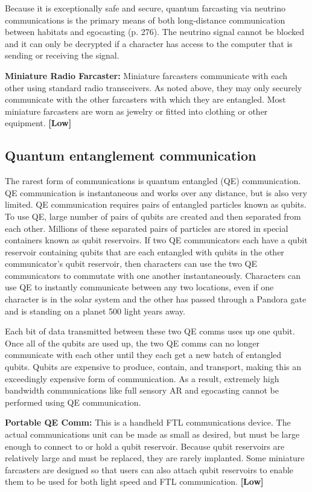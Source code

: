 Because it is exceptionally safe and secure, quantum farcasting via neutrino communications is the primary means of both long-distance communication between habitats and egocasting (p. 276). The neutrino signal cannot be blocked and it can only be decrypted if a character has access to the computer that is sending or receiving the signal. 

\textbf{Miniature Radio Farcaster:} Miniature farcasters communicate with each other using standard radio transceivers. As noted above, they may only securely communicate with the other farcasters with which they are entangled. Most miniature farcasters are worn as jewelry or fitted into clothing or other equipment. \textbf{[Low]} 



\subsection{Quantum entanglement communication} \label{sec:quantum-entanglement-communication} 

The rarest form of communications is quantum entangled (QE) communication. QE communication is instantaneous and works over any distance, but is also very limited. QE communication requires pairs of entangled particles known as qubits. To use QE, large number of pairs of qubits are created and then separated from each other. Millions of these separated pairs of particles are stored in special containers known as qubit reservoirs. If two QE communicators each have a qubit reservoir containing qubits that are each entangled with qubits in the other communicator’s qubit reservoir, then characters can use the two QE communicators to commutate with one another instantaneously. Characters can use QE to instantly communicate between any two locations, even if one character is in the solar system and the other has passed through a Pandora gate and is standing on a planet 500 light years away. 

Each bit of data transmitted between these two QE comms uses up one qubit. Once all of the qubits are used up, the two QE comms can no longer communicate with each other until they each get a new batch of entangled qubits. Qubits are expensive to produce, contain, and transport, making this an exceedingly expensive form of communication. As a result, extremely high bandwidth communications like full sensory AR and egocasting cannot be performed using QE communication. 

\textbf{Portable QE Comm:} This is a handheld FTL communications device. The actual communications unit can be made as small as desired, but must be large enough to connect to or hold a qubit reservoir. Because qubit reservoirs are relatively large and must be replaced, they are rarely implanted. Some miniature farcasters are designed so that users can also attach qubit reservoirs to enable them to be used for both light speed and FTL communication. \textbf{[Low]} 


